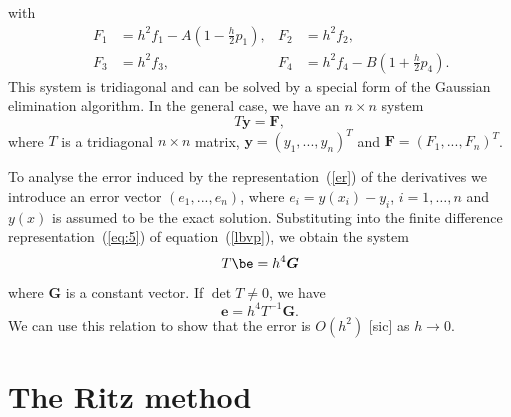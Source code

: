 %
with
%
\begin{align*}
  & &  F_1 & = h^2 f_1 - A (1 - \frac{h}{2} p_1), &
  F_2 & = h^2 f_2, \\
  & &  F_3 & = h^2 f_3, & F_4 & = h^2 f_4 - B(1 + \frac{h}{2} p_4).
\end{align*}
%
This system is tridiagonal and can be solved by a special form of the
Gaussian elimination algorithm. In the general case, we have an
$n\times n$ system
%
\begin{equation}
  T \boldsymbol{y} = \boldsymbol{F},
  \label{eq:5}
\end{equation}
%
where $T$ is a tridiagonal $n\times n$ matrix,
$\boldsymbol{y}=(y_1,...,y_n)^T$ and $\boldsymbol{F}=(F_1,...,F_n)^T$.

To analyse the error induced by the representation~(\ref{er}) of the
derivatives we introduce an error vector $(e_1,...,e_n)$, where
$e_i=y(x_i)-y_i$, $i=1,\ldots,n$ and $y(x)$ is assumed to be the exact
solution.  Substituting into the finite difference
representation~(\ref{eq:5}) of equation~(\ref{lbvp}), we obtain the
system
%
\begin{equation*}
  T \be = h^4 \boldsymbol{G}
\end{equation*}
%
where $\boldsymbol{G}$ is a constant vector.   If $\det T \ne 0$, we have
%
\begin{equation*}
  \boldsymbol{e}=h^4T^{-1}\boldsymbol{G}.
\end{equation*}
%
We can use this relation to show that the error is $O(h^2)$ [sic] as
$h \to 0$.

\section{The Ritz method}

